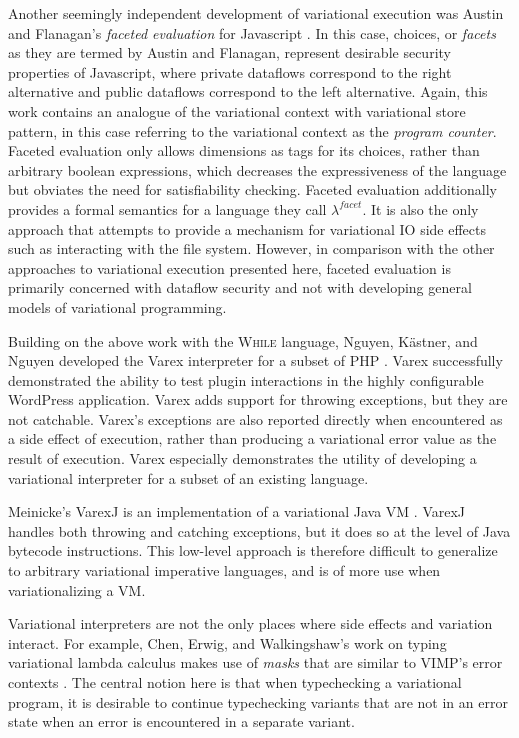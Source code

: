 \documentclass[12pt,oneside]{book}
\begin{document}
 Another seemingly independent development of variational execution was Austin and Flanagan's \emph{faceted evaluation} for Javascript \cite{faceted}.
 In this case, choices, or \emph{facets} as they are termed by Austin and Flanagan, represent desirable security properties of Javascript, where
 private dataflows correspond to the right alternative and public dataflows correspond to the left alternative.
 Again, this work contains an analogue of the variational context with variational store pattern, in this case referring to the variational context as
 the \emph{program counter}. Faceted evaluation only allows dimensions as tags for its choices, rather than arbitrary boolean expressions, which
 decreases the expressiveness of the language but obviates the need for satisfiability checking. Faceted evaluation additionally provides a formal
 semantics for a language they call $\lambda^{\mathit{facet}}$. It is also the only approach that attempts to provide a mechanism for variational IO
 side effects such as interacting with the file system. However, in comparison with the other approaches to variational execution presented here,
 faceted evaluation is primarily concerned with dataflow security and not with developing general models of variational programming.
 
 Building on the above work with the \textsc{While} language, Nguyen, K\"astner, and Nguyen developed the Varex interpreter for a subset of PHP \cite{varex}.
 Varex successfully demonstrated the ability to test plugin interactions in the highly configurable WordPress application. Varex adds support for throwing
 exceptions, but they are not catchable. Varex's exceptions are also reported directly when encountered as a side effect of execution, rather than producing
 a variational error value as the result of execution. Varex especially demonstrates the utility of developing a variational interpreter for a subset of an
 existing language.
 
 Meinicke's VarexJ is an implementation of a variational Java VM \cite{varexj}. VarexJ handles both throwing and catching exceptions, but it does so
 at the level of Java bytecode instructions. This low-level approach is therefore difficult to generalize to arbitrary variational imperative languages, and
 is of more use when variationalizing a VM.
 
 Variational interpreters are not the only places where side effects and variation interact. For example, Chen, Erwig, and Walkingshaw's work
 on typing variational lambda calculus makes use of \emph{masks} that are similar to VIMP's error contexts \cite{CEW12icfp}. The central
 notion here is that when typechecking a variational program, it is desirable to continue typechecking variants that are not in an error state when
 an error is encountered in a separate variant.
\end{document}
